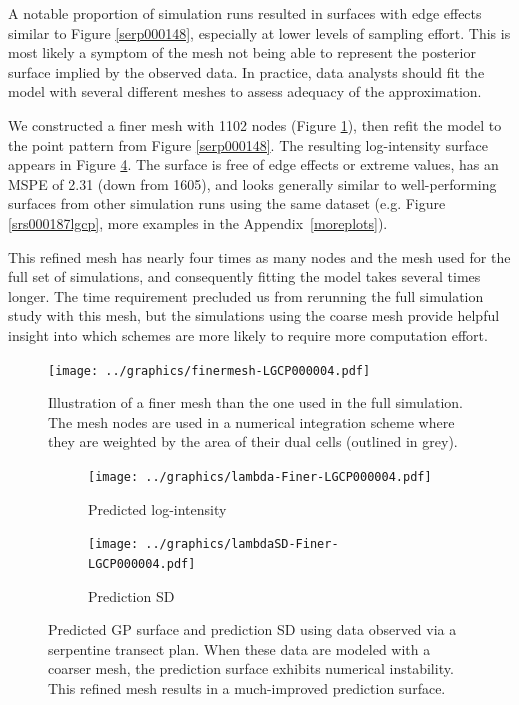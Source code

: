 \documentclass[review]{elsarticle}
\begin{document}
A notable proportion of simulation runs resulted in surfaces with edge effects
similar to Figure \ref{serp000148}, especially at lower levels of sampling
effort. This is most likely a symptom of the mesh not being able to represent
the posterior surface implied by the observed data. In practice, data analysts
should fit the model with several different meshes to assess adequacy of the
approximation.

We constructed a finer mesh with 1102 nodes (Figure \ref{meshfiner}), then
refit the model to the point pattern from Figure \ref{serp000148}. The
resulting log-intensity surface appears in Figure \ref{finer}. The surface is
free of edge effects or extreme values, has an MSPE of 2.31 (down from 1605),
and looks generally similar to well-performing surfaces from other simulation
runs using the same dataset (e.g. Figure \ref{srs000187lgcp}, more examples
in the Appendix~\ref{moreplots}).

This refined mesh has nearly four times as many nodes and the mesh used for
the full set of simulations, and consequently fitting the model takes several
times longer. The time requirement precluded us from rerunning the full
simulation study with this mesh, but the simulations using the coarse mesh
provide helpful insight into which schemes are more likely to require more
computation effort.

\begin{figure}
\texttt{[image: ../graphics/finermesh-LGCP000004.pdf]}
\caption{Illustration of a finer mesh than the one used in the full simulation.
The mesh nodes are used in a numerical integration scheme where they are
weighted by the area of their dual cells (outlined in grey).}
\label{meshfiner}
\end{figure}

\begin{figure}

\begin{subfigure}{5in}
\texttt{[image: ../graphics/lambda-Finer-LGCP000004.pdf]}
\caption{Predicted log-intensity}
\label{lambdafinerlgcp}
\end{subfigure}

\begin{subfigure}{5in}
\texttt{[image: ../graphics/lambdaSD-Finer-LGCP000004.pdf]}
\caption{Prediction SD}
\label{sdfinerlgcp}
\end{subfigure}

\caption{Predicted GP surface and prediction SD using data observed via a
serpentine transect plan. When these data are modeled with a coarser mesh, the
prediction surface exhibits numerical instability. This refined mesh results in
a much-improved prediction surface.}
\label{finer}
\end{figure}
\end{document}
